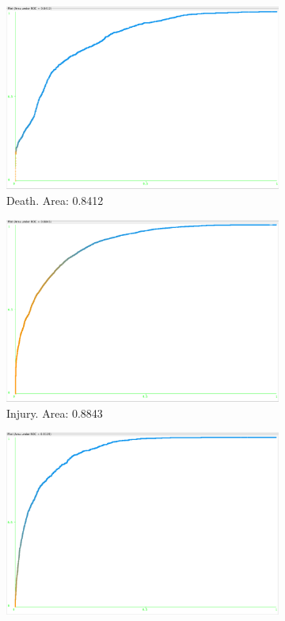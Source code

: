\documentclass[11pt, notitlepage,abstracton,oneside]{article}   	%
\begin{document}
\begin{figure}[H]
    \centering
    \begin{subfigure}[b]{0.3\textwidth}
        \centering
        \includegraphics[width=\textwidth]{figures/death}
        \caption{Death. Area: 0.8412}
        \label{fig:death}
    \end{subfigure}
    \hfill
    \begin{subfigure}[b]{0.3\textwidth}
        \centering
        \includegraphics[width=\textwidth]{figures/injury}
        \caption{Injury. Area: 0.8843}
        \label{fig:injury}
    \end{subfigure}
    \hfill
    \begin{subfigure}[b]{0.3\textwidth}
        \centering
        \includegraphics[width=\textwidth]{figures/other}

\end{subfigure}
\end{figure}
\end{document}
